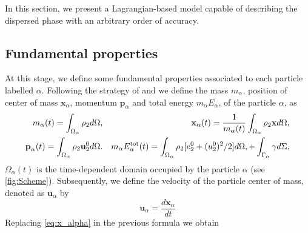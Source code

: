 
In this section, we present a Lagrangian-based model capable of describing the dispersed phase with an arbitrary order of accuracy.

\subsection{Fundamental properties}

At this stage, we define some fundamental properties associated to each particle labelled $\alpha$.
Following the strategy of \citet{lhuillier2009rheology,lhuillier1992volume,zaepffel2011modelisation} and \citet[Chapter 2]{morel2015mathematical}
we define the mass $m_\alpha$, position of center of mass $\mathbf{x}_\alpha$, momentum $\textbf{p}_\alpha$ and total energy $m_\alpha E_\alpha$, of the particle $\alpha$, as
\begin{align}
    m_\alpha(t)
    = \int_{\Omega_\alpha}  \rho_2   d\Omega, 
    &&
    \textbf{x}_\alpha(t)
    = \frac{1}{m_\alpha(t) }\int_{\Omega_\alpha}  \rho_2 \textbf{x}  d\Omega, \\
    \textbf{p}_\alpha(t) 
    = \int_{\Omega_\alpha}  \rho_2 \textbf{u}_2^0  d\Omega.
    &&
     m_\alpha E_\alpha^\text{tot}(t) 
    = \int_{\Omega_\alpha}  \rho_2 [e_2^0 + (u_2^0)^2/2]  d\Omega,
    + \int_{\Gamma_\alpha}  \gamma  d\Sigma,
\end{align}
 $\Omega_\alpha(t)$ is the time-dependent domain occupied by the particle $\alpha$ (see \ref{fig:Scheme}). 
Subsequently, we define the velocity of the particle center of mass, denoted as $\textbf{u}_\alpha$ by 
\begin{equation}
\textbf{u}_\alpha = \frac{d \textbf{x}_\alpha}{dt}  
\end{equation}
Replacing \eqref{eq:x_alpha} in the previous formula we obtain

